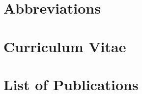 \documentclass[a4paper,11pt,twoside,openright]{scrbook}
\begin{document}
\frontmatter





\tableofcontents

\mainmatter









\begin{appendices}

\end{appendices}

\backmatter
\cleardoublepage



\chapter{Abbreviations}


\chapter{Curriculum Vitae}


\chapter{List of Publications}

\end{document}
